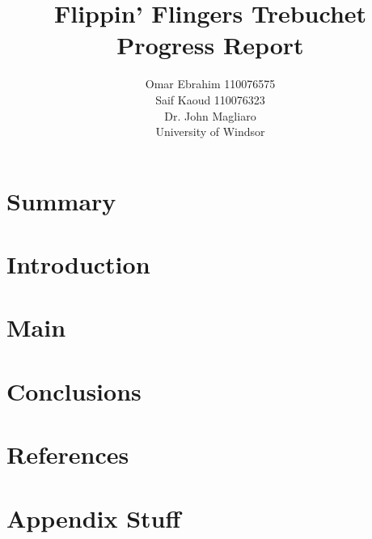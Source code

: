 \documentclass[12pt, titlepage]{article}
\title{Flippin' Flingers Trebuchet Progress Report}
\author{Omar Ebrahim 110076575\\Saif Kaoud 110076323\\[10pt] Dr. John Magliaro\\
University of Windsor}
\begin{document}
    \maketitle
    \section{Summary}
    \newpage
    \tableofcontents \newpage
    \listoffigures \newpage
    \listoftables \newpage
    \section{Introduction}
    \newpage
    \section{Main}
    \newpage
    \section{Conclusions}
    \newpage
    \section{References}
    \newpage

    \appendix
    \section{Appendix Stuff}
\end{document}
